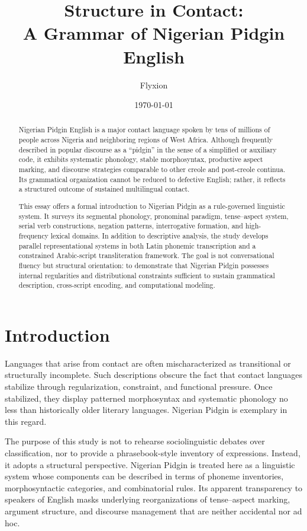 \documentclass[12pt]{article}
\title{\textbf{Structure in Contact:\\
A Grammar of Nigerian Pidgin English}}
\author{Flyxion}
\date{\today}
\begin{document}
\maketitle

\begin{abstract}
\noindent
Nigerian Pidgin English is a major contact language spoken by tens of millions of people across Nigeria and neighboring regions of West Africa. Although frequently described in popular discourse as a “pidgin” in the sense of a simplified or auxiliary code, it exhibits systematic phonology, stable morphosyntax, productive aspect marking, and discourse strategies comparable to other creole and post-creole continua. Its grammatical organization cannot be reduced to defective English; rather, it reflects a structured outcome of sustained multilingual contact.

This essay offers a formal introduction to Nigerian Pidgin as a rule-governed linguistic system. It surveys its segmental phonology, pronominal paradigm, tense–aspect system, serial verb constructions, negation patterns, interrogative formation, and high-frequency lexical domains. In addition to descriptive analysis, the study develops parallel representational systems in both Latin phonemic transcription and a constrained Arabic-script transliteration framework. The goal is not conversational fluency but structural orientation: to demonstrate that Nigerian Pidgin possesses internal regularities and distributional constraints sufficient to sustain grammatical description, cross-script encoding, and computational modeling.
\end{abstract}

\newpage
\section{Introduction}

Languages that arise from contact are often mischaracterized as transitional or structurally incomplete. Such descriptions obscure the fact that contact languages stabilize through regularization, constraint, and functional pressure. Once stabilized, they display patterned morphosyntax and systematic phonology no less than historically older literary languages. Nigerian Pidgin is exemplary in this regard.

The purpose of this study is not to rehearse sociolinguistic debates over classification, nor to provide a phrasebook-style inventory of expressions. Instead, it adopts a structural perspective. Nigerian Pidgin is treated here as a linguistic system whose components can be described in terms of phoneme inventories, morphosyntactic categories, and combinatorial rules. Its apparent transparency to speakers of English masks underlying reorganizations of tense–aspect marking, argument structure, and discourse management that are neither accidental nor ad hoc.
\end{document}
